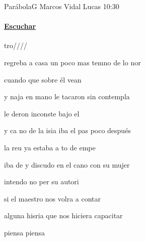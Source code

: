 \documentclass[12pt, spanish]{book}
\newcommand{\RevDate}{\today}
\newcommand{\NotCCLIed}{\relax}
\begin{document}
    \begin{song}{Par\'abola}{G}
        {} %
        {Marcos Vidal}
        {Lucas 10:30} %
        {} %
        \ifChordBk
        \paragraph{\mbox{}\hfill\protect\href{https://youtu.be/cxkfqxpuICM}{Escuchar}\mbox{}\hfill}
        \fi


        \begin{SBOpGroup}
            tro////
        \end{SBOpGroup}

        \begin{SBVerse}

            regreba a casa un poco mas temno de lo nor

            cuando  que sobre él vean 

            y naja en mano le tacaron sin contempla

            le deron inconste bajo el 
        \end{SBVerse}
        \begin{SBOpGroup}
        \end{SBOpGroup}
        \begin{SBVerse}
            y ca  no de la isia iba el pas poco después

            la reu ya estaba a to de empe

            iba de y discudo en el cano con su mujer

            intendo no per su autori


             si el maestro nos volra a contar

            alguna hisria que nos hiciera capacitar

            piensa piensa

        \end{SBVerse}
        \begin{SBOpGroup}
        \end{SBOpGroup}


\end{song}
\end{document}
